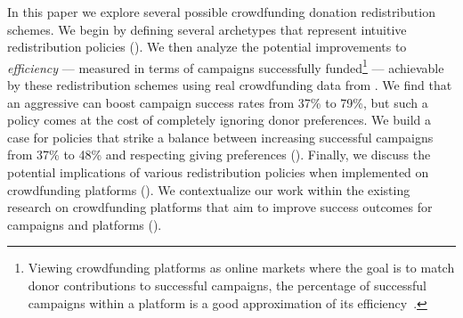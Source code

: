 In this paper we explore several possible crowdfunding donation redistribution schemes. We begin by defining several archetypes that represent intuitive redistribution policies (). We then analyze the potential improvements to \textit{efficiency} --- measured in terms of campaigns successfully funded\footnote{Viewing crowdfunding platforms as online markets where the goal is to match donor contributions to successful campaigns, the percentage of successful campaigns within a platform is a good approximation of its efficiency~\cite{wash-returnrule}.} --- achievable by these redistribution schemes using real crowdfunding data from \lag. We find that an aggressive \car can boost campaign success rates from 37\% to 79\%, but such a policy comes at the cost of completely ignoring donor preferences. We build a case for \cpr policies that strike a balance between increasing successful campaigns from 37\% to 48\% and respecting giving preferences (). Finally, we discuss the potential implications of various redistribution policies when implemented on crowdfunding platforms (). We contextualize our work within the existing research on crowdfunding platforms that aim to improve success outcomes for campaigns and platforms (). 